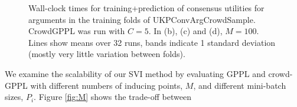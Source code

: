 \begin{figure}
\centering
{}
\caption{
    Wall-clock times for training+prediction of consensus utilities for arguments 
    in the training folds of
    UKPConvArgCrowdSample. CrowdGPPL was run with $C=5$. In (b), (c) and (d),  $M=100$.
    Lines show means over 32 runs,
     bands indicate 1 standard deviation (mostly very little variation between folds).
}
\end{figure}
We examine the scalability of our SVI method by evaluating GPPL and crowd-GPPL with
different numbers of inducing points, $M$,
and different mini-batch sizes, $P_i$.
Figure \ref{fig:M} shows the trade-off between
